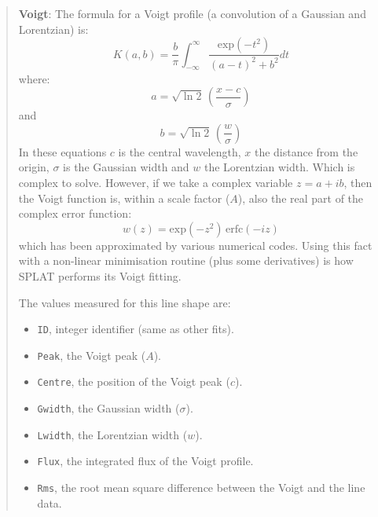 \documentclass[twoside,11pt]{article}
\renewcommand{\_}{\texttt{\symbol{95}}}
\newcommand{\labelitem}[1]{\textbf{#1}}
\newcommand{\hitext}[1]{\texttt{#1}}
\begin{document}
\begin{quote}
 \labelitem{Voigt}: The formula for a Voigt profile (a convolution of a
 Gaussian and Lorentzian) is:
 \[
 K(a,b) = \frac{b}{\pi}\int_{-\infty}^{\infty}\frac{\mathrm{exp}(-t^{2})}{(a-t)^{2}+b^{2}}dt
 \]
 where:
 \[
 a = \sqrt{\ln{2}} \, \left(\frac{x-c}{\sigma}\right)
 \]
 and
 \[
 b = \sqrt{\ln{2}} \, \left(\frac{w}{\sigma}\right)
 \]
 In these equations $c$ is the central wavelength, $x$ the distance
 from the origin, $\sigma$ is the
 Gaussian width and $w$ the Lorentzian width. Which is complex to
 solve. However, if we take a complex variable $z=a+ib$, then the
 Voigt function is, within a scale factor ($A$), also the real part of
 the complex error function:
 \[
 w(z) = \mathrm{exp}(-z^{2}) \, \mathrm{erfc}(-iz)
 \]
 which has been approximated by various numerical codes. Using this
 fact with a non-linear minimisation routine (plus some derivatives) is
 how SPLAT performs its Voigt fitting.

 The values measured for this line shape are:
 \begin{itemize}
   \item \hitext{ID}, integer identifier (same as other fits).
   \item \hitext{Peak}, the Voigt peak ($A$).
   \item \hitext{Centre}, the position of the Voigt peak ($c$).
   \item \hitext{Gwidth}, the Gaussian width ($\sigma$).
   \item \hitext{Lwidth}, the Lorentzian width ($w$).
   \item \hitext{Flux}, the integrated flux of the Voigt profile.
   \item \hitext{Rms}, the root mean square difference between the
         Voigt and the line data.
 \end{itemize}
\end{quote}
\end{document}
